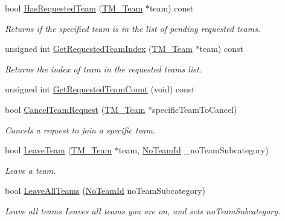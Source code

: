 \begin{DoxyCompactItemize}
bool \hyperlink{class_rak_net_1_1_t_m___team_member_ac2910cfa4dfa1660e8412132e2f2321f}{Has\-Requested\-Team} (\hyperlink{class_rak_net_1_1_t_m___team}{T\-M\-\_\-\-Team} $\ast$team) const 
\begin{DoxyCompactList}\small\item\em Returns if the specified team is in the list of pending requested teams. \end{DoxyCompactList}\item 
unsigned int \hyperlink{class_rak_net_1_1_t_m___team_member_abb9b5a20845eb0ddabcc0cfc16ce7075}{Get\-Requested\-Team\-Index} (\hyperlink{class_rak_net_1_1_t_m___team}{T\-M\-\_\-\-Team} $\ast$team) const 
\begin{DoxyCompactList}\small\item\em Returns the index of {\itshape team} in the requested teams list. \end{DoxyCompactList}\item 
unsigned int \hyperlink{class_rak_net_1_1_t_m___team_member_a2c1ba2d978dc81f89fea4b819c7a8abb}{Get\-Requested\-Team\-Count} (void) const 
\item 
bool \hyperlink{class_rak_net_1_1_t_m___team_member_a069f3222b106da18083c3a4405cea355}{Cancel\-Team\-Request} (\hyperlink{class_rak_net_1_1_t_m___team}{T\-M\-\_\-\-Team} $\ast$specific\-Team\-To\-Cancel)
\begin{DoxyCompactList}\small\item\em Cancels a request to join a specific team. \end{DoxyCompactList}\item 
bool \hyperlink{class_rak_net_1_1_t_m___team_member_adf88d85675c0462ee96eb58c4a1ae29c}{Leave\-Team} (\hyperlink{class_rak_net_1_1_t_m___team}{T\-M\-\_\-\-Team} $\ast$team, \hyperlink{group___t_e_a_m___m_a_n_a_g_e_r___g_r_o_u_p_gadd1e99b7724ceb0f6794f46de31a6b02}{No\-Team\-Id} \-\_\-no\-Team\-Subcategory)
\begin{DoxyCompactList}\small\item\em Leave a team. \end{DoxyCompactList}\item 
bool \hyperlink{class_rak_net_1_1_t_m___team_member_a8b4a5dd01b92259ad7f7a896ba54bf65}{Leave\-All\-Teams} (\hyperlink{group___t_e_a_m___m_a_n_a_g_e_r___g_r_o_u_p_gadd1e99b7724ceb0f6794f46de31a6b02}{No\-Team\-Id} no\-Team\-Subcategory)
\begin{DoxyCompactList}\small\item\em Leave all teams  Leaves all teams you are on, and sets {\itshape no\-Team\-Subcategory}. \end{DoxyCompactList}\item 

\end{DoxyCompactItemize}
